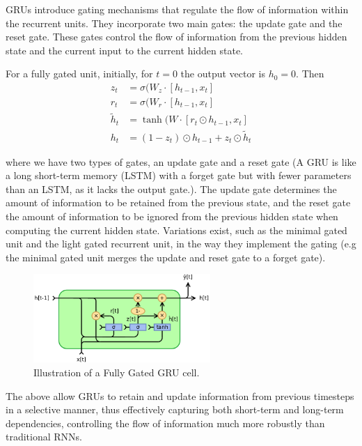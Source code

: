 \documentclass{article}
\begin{document}
\begin{itemize}
	GRUs introduce gating mechanisms that regulate the flow of information within the recurrent units. They incorporate two main gates: the update gate and the reset gate. These gates control the flow of information from the previous hidden state and the current input to the current hidden state.
	
	For a fully gated unit, initially, for $t = 0$ the output vector is $h_0 = 0$. Then
	\begin{align*}
		z_t &= \sigma(W_{z}\cdot [h_{t-1},x_t] \\
		r_t &= \sigma(W_{r}\cdot [h_{t-1},x_t] \\
		\tilde{h}_t &= \tanh (W \cdot [r_t \odot h_{t-1},x_t] \\
		h_t &=   (1-z_t) \odot h_{t-1} + z_t \odot  \tilde{h}_t 
\end{align*}

where we have two types of gates, an update gate and a reset gate (A GRU is like a long short-term memory (LSTM) with a forget gate but with fewer parameters than an LSTM, as it lacks the output gate.). The update gate determines the amount of information to be retained from the previous state, and the reset gate the amount of information to be ignored from the previous hidden state when computing the current hidden state. Variations exist, such as the minimal gated unit and the light gated recurrent unit, in the way they implement the gating (e.g the minimal gated unit merges the update and reset gate to a forget gate). \\

	\begin{figure}
		\centering
		\includegraphics[width=0.6\textwidth]{images/Gated_Recurrent_Unit_base_type.png}
	    \caption{Illustration of a Fully Gated GRU cell.}
	\end{figure}

The above allow GRUs to retain and update information from previous timesteps in a selective manner, thus effectively capturing both short-term and long-term dependencies, controlling the flow of information much more robustly than traditional RNNs.
	
\end{itemize}
\end{document}
